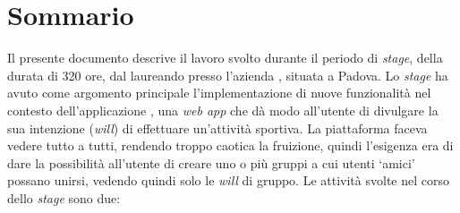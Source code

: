 
\cleardoublepage
{}
{}
\begingroup
\let\clearpage\relax
\let\cleardoublepage\relax
\let\cleardoublepage\relax

\chapter*{Sommario}

Il presente documento descrive il lavoro svolto durante il periodo di
\textit{stage},
della durata di 320 ore, dal laureando \myName\xspace presso
l'azienda \myCompany, situata a Padova.
Lo \textit{stage} ha avuto come argomento principale l'implementazione di nuove
funzionalità nel contesto dell'applicazione \productName, una
\textit{web app} che dà modo all'utente di divulgare la sua intenzione
(\textit{will}) di effettuare un'attività sportiva.
La piattaforma faceva vedere tutto a tutti, rendendo troppo caotica la
fruizione, quindi l'esigenza era di dare la possibilità all'utente
di creare uno o più gruppi a cui utenti \enquote*{amici} possano unirsi,
vedendo quindi solo le \textit{will} di gruppo.
Le attività svolte nel corso dello \textit{stage} sono due:
